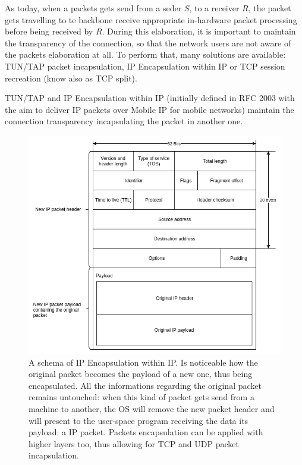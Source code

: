 \documentclass[10pt]{book}
\begin{document}
As today, when a packets gets send from a seder $S$, to a receiver $R$, the 
packet gets travelling to te backbone receive appropriate in-hardware packet 
processing before being received by $R$. During this elaboration, it is 
important to maintain the transparency of the connection, so that the network 
users are not aware of the packets elaboration at all. To perform that, many 
solutions are available: TUN/TAP packet incapsulation, IP Encapsulation within 
IP or TCP session recreation (know also as TCP split).

TUN/TAP and IP Encapsulation within IP (initially defined in RFC 2003 with the 
aim to deliver IP packets over Mobile IP for mobile networks) maintain the 
connection transparency incapsulating the packet in another one.
\begin{figure}[t]
  \centering
  \includegraphics[scale=0.5]{IPoverIP}
  \caption[IP Encapsulation within IP packet schema]{A schema of IP 
Encapsulation within IP. Is noticeable how the original packet becomes the 
payload of a new one, thus being encapsulated. All the informations regarding 
the original packet remains untouched: when this kind of packet gets send 
from a machine to another, the OS will remove the new packet header and will 
present to the user-space program receiving the data its payload: a IP 
packet. Packets encapsulation can be applied with higher layers too, thus 
allowing for TCP and UDP packet incapsulation.}
  \label{chap:prjan:img:ip_over_ip}
\end{figure}
\end{document}
